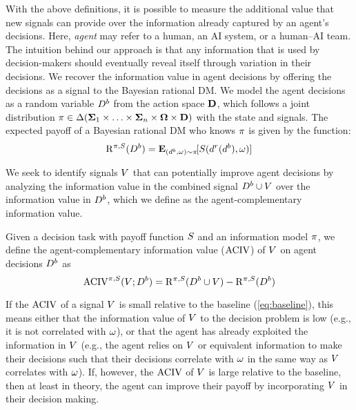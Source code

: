 With the above definitions, it is possible to measure the additional value that new signals can provide over the information already captured by an agent’s decisions. Here, \textit{agent} may refer to a human, an AI system, or a human–AI team.
The intuition behind our approach is that any information that is used by decision-makers should eventually reveal itself through variation in their decisions.
We recover the information value in agent decisions by offering the decisions as a signal to the Bayesian rational DM.
We model the agent decisions as a random variable $D^b$ from the action space $\mathbf{D}$, which follows a joint distribution $\pi \in \Delta(\mathbf{\Sigma}_1 \times \ldots \times \mathbf{\Sigma}_n \times \mathbf{\Omega} \times  \mathbf{D})$ with the state and signals.
The expected payoff of a Bayesian rational DM who knows $\pi$ is given by the function:
 \mvspace{-1mm}
\[
\mathrm{R}^{\dgp, \score}
(\actionvar^b)
= \expect[(\action^b, \payoffstatevalue) \sim \dgp]{\score(\action^r(\action^b), \payoffstatevalue)}
\]
 \mvspace{-5mm}
 
We seek to identify signals $V$ that can potentially improve agent decisions by analyzing the information value in the combined signal $D^b \cup V$ over the information value in $D^b$, which we define as the agent-complementary information value.
\begin{definition}
\label{def:aciv}
Given a decision task with payoff function $S$ and an information model $\pi$, we define the agent-complementary information value ($\operatorname{ACIV}$) of $V$ on agent decisions $D^b$ as 
\mvspace{-1mm}\begin{equation}
    \operatorname{ACIV}^{\pi, S}(V; D^b) = \mathrm{R}^{\pi, S}(D^b \cup V) - \mathrm{R}^{\pi, S}(D^b)
\end{equation}
\end{definition}
\mvspace{-3mm}

If the $\operatorname{ACIV}$ of a signal $V$ is small relative to the baseline (\ref{eq:baseline}), this means either that the information value of $V$ to the decision problem is low (e.g., it is not correlated with $\omega$), or that the agent has already exploited the information in $V$ (e.g., the agent relies on $V$ or equivalent information to make their decisions such that their decisions correlate with $\omega$ in the same way as $V$ correlates with $\omega$).
If, however, the $\operatorname{ACIV}$ of $V$ is large relative to the baseline, then at least in theory, the agent can improve their payoff by incorporating $V$ in their decision making.

